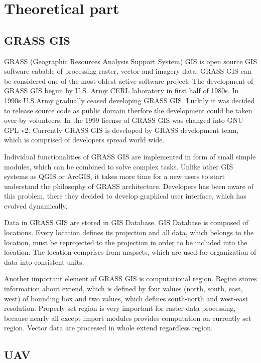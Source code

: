 \documentclass[a4paper,12pt]{report}
\begin{document}
\newpage

\chapter{Theoretical part}


\section{GRASS GIS}

GRASS (Geographic Resources Analysis Support System) GIS is open source GIS software cabable of processing raster, vector and imagery data. 
GRASS GIS can be considered one of 
the most oldest active software project. The development of GRASS GIS begun by U.S. Army CERL  laboratory
in first half of 1980s. In 1990s U.S.Army gradually ceased developing GRASS GIS. Luckily it was decided to 
release source code as public domain therfore the development could be taken over by volunteers. In the 1999 license 
of GRASS GIS was changed into GNU GPL v2. Currently GRASS GIS is developed by GRASS development 
team, which is comprised of developers spread world wide. 
 
Individual functionalities of GRASS GIS are implemented in form of small simple modules, which 
can be combined to solve complex tasks.
Unlike other GIS systems as QGIS or ArcGIS, it takes 
more time for a new users to start understand the philosophy of GRASS architecture. Developers 
has been aware of this problem, there they decided to develop graphical user interface, which 
has evolved dynamically.

Data in GRASS GIS are stored in GIS Database. GIS Database is composed of locations. Every location 
defines its projection and all data, which belongs to the location, must be reprojected to 
the projection in order to be included into the location. The location comprises from mapsets, which are used for organization 
of data into consistent units. 

Another important element of GRASS GIS is computational region. Region stores information about 
extend, which is defined by four values (north, south, east, west) of bounding box and 
two values, which defines south-north and west-east resolution. Properly set region is 
very important for raster data processing, because nearly all except import modules provides computation 
on currently set region. Vector data are processed in whole extend regardless region.


\section{UAV}
\end{document}
